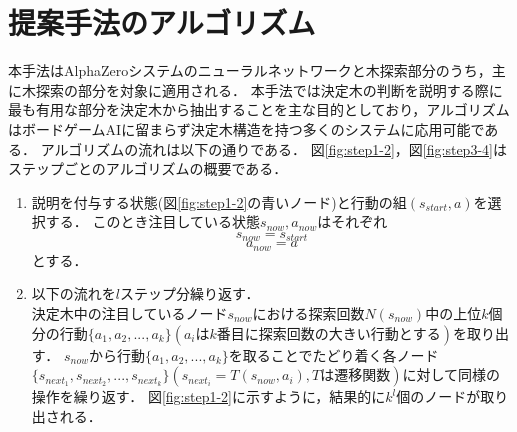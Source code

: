 \section{提案手法のアルゴリズム}
本手法はAlphaZeroシステムのニューラルネットワークと木探索部分のうち，主に木探索の部分を対象に適用される．
本手法では決定木の判断を説明する際に最も有用な部分を決定木から抽出することを主な目的としており，アルゴリズムはボードゲームAIに留まらず決定木構造を持つ多くのシステムに応用可能である．
アルゴリズムの流れは以下の通りである．
図\ref{fig:step1-2}，図\ref{fig:step3-4}はステップごとのアルゴリズムの概要である．
\begin{enumerate}
    \item 説明を付与する状態(図\ref{fig:step1-2}の青いノード)と行動の組$(s_{start}, a)$を選択する．
    このとき注目している状態$s_{now}, a_{now}$はそれぞれ
    \begin{equation}
        {s_{now}=s_{start}}
    \end{equation}
    \begin{equation}
        {a_{now}=a}
    \end{equation}
    とする．
    \item 以下の流れを$l$ステップ分繰り返す．\\
    決定木中の注目しているノード$s_{now}$における探索回数$N(s_{now})$中の上位$k$個分の行動$\{a_1, a_2, ..., a_{k}\}(a_iはk番目に探索回数の大きい行動とする)$を取り出す．
    $s_{now}$から行動$\{a_1, a_2, ..., a_{k}\}$を取ることでたどり着く各ノード\\
    $\{s_{next_1}, s_{next_2}, ..., s_{next_{k}}\}(s_{next_i}=T(s_{now}, a_i), Tは遷移関数)$に対して同様の操作を繰り返す．
    図\ref{fig:step1-2}に示すように，結果的に$k^l$個のノードが取り出される．
    

\end{enumerate}
